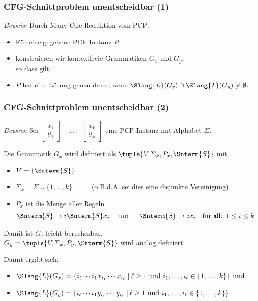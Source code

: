 \documentclass[aspectratio=1610,onlymath]{beamer}
\begin{document}
\begin{frame}\frametitle{CFG-Schnittproblem unentscheidbar (1)}


\pause\emph{Beweis:} Durch Many-One-Reduktion vom PCP:\pause\medskip

\begin{itemize}
\item Für eine gegebene PCP-Instanz $P$
\item konstruieren wir kontextfreie Grammatiken $G_x$ und $G_y$,\\[1ex]
	so dass gilt:
\item $P$ hat eine Lösung genau dann, wenn $\Slang{L}(G_x)\cap\Slang{L}(G_y)\neq\emptyset$.
\end{itemize}

\end{frame}

\begin{frame}[t]\frametitle{CFG-Schnittproblem unentscheidbar (2)}

\emph{Beweis:} Sei $\left[\begin{matrix}x_1\\y_1\end{matrix}\right]\quad\ldots\quad\left[\begin{matrix}x_k\\y_k\end{matrix}\right]$ eine PCP-Instanz mit Alphabet $\Sigma$.
\medskip\pause

Die Grammatik $G_x$ wird definiert als $\tuple{V,\Sigma_k,P_x,\Snterm{S}}$ mit
\begin{itemize}
\item $V=\{\Snterm{S}\}$
\item $\Sigma_k = \Sigma \cup\{1,\ldots,k\}$~~~~~ (o.B.d.A. sei dies eine disjunkte Vereinigung)
\item $P_x$ ist die Menge aller Regeln 
\begin{align*}
\Snterm{S}\to i\Snterm{S}x_i\quad\text{ und }\quad\Snterm{S}\to i x_i && \text{für alle $1\leq i\leq k$}
\end{align*}

\end{itemize}
Damit ist $G_x$ leicht berechenbar.\\
$G_y=\tuple{V,\Sigma_k,P_y,\Snterm{S}}$ wird analog definiert.\bigskip\pause

Damit ergibt sich:
\begin{itemize}
\item $\Slang{L}(G_x)=\{ i_\ell\cdots i_1 x_{i_1}\cdots x_{i_\ell}\mid \ell\geq 1\text{ und } i_1,\ldots,i_\ell\in\{1,\ldots,k\}\}$ und
\item $\Slang{L}(G_y)=\{ i_\ell\cdots i_1 y_{i_1}\cdots y_{i_\ell}\mid \ell\geq 1\text{ und } i_1,\ldots,i_\ell\in\{1,\ldots,k\}\}$
\end{itemize}

\end{frame}
\end{document}
